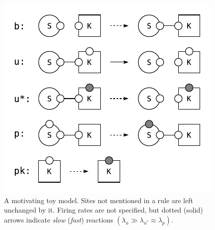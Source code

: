 
\begin{figure}[h]
  \vskip -0.2cm
  \begin{center}
    \includegraphics[scale=0.9]{figures/model.pdf}
  \end{center}
  \vskip -0.2cm
  \caption{A motivating toy model. Sites not mentioned in a rule are
    left unchanged by it.   Firing rates are not specified, but
    dotted (solid) arrows indicate \textit{slow} (\textit{fast})
    reactions
    $(\lambda_u \gg \lambda_{u^*} \approx \lambda_p)$.}
  \label{fig:model}
\end{figure}
